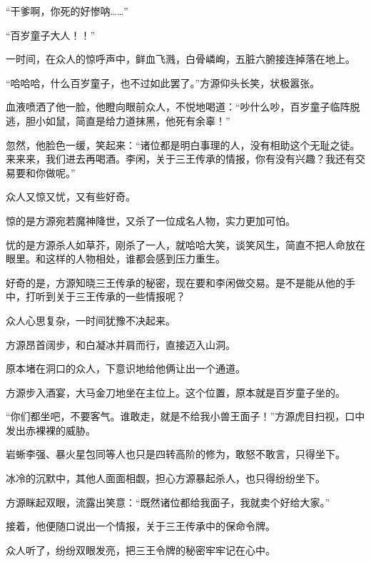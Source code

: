 \begin{this_body}
“干爹啊，你死的好惨呐……”

“百岁童子大人！！”

一时间，在众人的惊呼声中，鲜血飞溅，白骨嶙峋，五脏六腑接连掉落在地上。

“哈哈哈，什么百岁童子，也不过如此罢了。”方源仰头长笑，状极嚣张。

血液喷洒了他一脸，他瞪向眼前众人，不悦地喝道：“吵什么吵，百岁童子临阵脱逃，胆小如鼠，简直是给力道抹黑，他死有余辜！”

忽然，他脸色一缓，笑起来：“诸位都是明白事理的人，没有相助这个无耻之徒。来来来，我们进去再喝酒。李闲，关于三王传承的情报，你有没有兴趣？我还有交易要和你做呢。”

众人又惊又忧，又有些好奇。

惊的是方源宛若魔神降世，又杀了一位成名人物，实力更加可怕。

忧的是方源杀人如草芥，刚杀了一人，就哈哈大笑，谈笑风生，简直不把人命放在眼里。和这样的人物相处，谁都会感到压力重生。

好奇的是，方源知晓三王传承的秘密，现在要和李闲做交易。是不是能从他的手中，打听到关于三王传承的一些情报呢？

众人心思复杂，一时间犹豫不决起来。

方源昂首阔步，和白凝冰并肩而行，直接迈入山洞。

原本堵在洞口的众人，下意识地给他俩让出一个通道。

方源步入酒宴，大马金刀地坐在主位上。这个位置，原本就是百岁童子坐的。

“你们都坐吧，不要客气。谁敢走，就是不给我小兽王面子！”方源虎目扫视，口中发出赤裸裸的威胁。

岩蜥李强、暴火星包同等人也只是四转高阶的修为，敢怒不敢言，只得坐下。

冰冷的沉默中，其他人面面相觑，担心方源暴起杀人，也只得纷纷坐下。

方源眯起双眼，流露出笑意：“既然诸位都给我面子，我就卖个好给大家。”

接着，他便随口说出一个情报，关于三王传承中的保命令牌。

众人听了，纷纷双眼发亮，把三王令牌的秘密牢牢记在心中。

\end{this_body}

